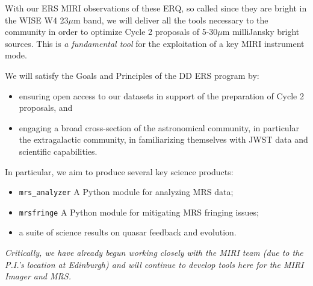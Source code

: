 With our ERS MIRI observations of these ERQ, so called since they are
bright in the WISE W4 23$\mu$m band, we will deliver all the tools
necessary to the community in order to optimize Cycle 2 proposals of
5-30$\mu$m milliJansky bright sources. This is {\it a fundamental
tool} for the exploitation of a key MIRI instrument mode.

\noindent
We will satisfy the Goals and Principles of the DD ERS program by:
\begin{itemize}
\item ensuring open access to our datasets in support of the preparation of Cycle 2 proposals, and
\item engaging a broad cross-section of the astronomical community, in particular the extragalactic community, in familiarizing themselves with JWST data and scientific capabilities.
\end{itemize}

\noindent
In particular, we aim to produce several key science products:
\begin{itemize}
\item {\tt mrs\_analyzer} A Python module for analyzing MRS data; 
\item {\tt mrsfringe} A Python module for mitigating MRS fringing issues; 
\item a suite of science results on quasar feedback and evolution. 
\end{itemize}

\noindent
{\it Critically, we have already begun working closely with the MIRI team (due to the P.I.'s location at Edinburgh) and will continue to develop tools here for the MIRI Imager and MRS.}\\


